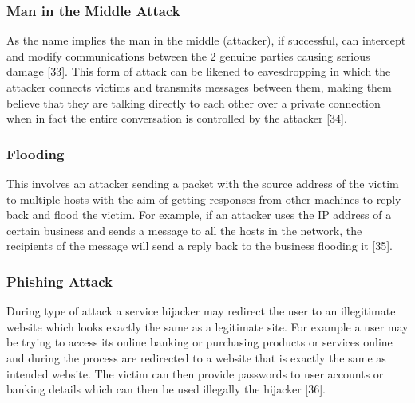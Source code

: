 \documentclass[10pt,journal,compsoc]{IEEEtran}
\begin{document}
\vspace{2mm}
\subsubsection{Man in the Middle Attack}
As the name implies the man in the middle (attacker), if successful, can intercept and modify communications between the 2 genuine parties causing serious damage [33]. This form of attack can be likened to eavesdropping in which the attacker connects victims and transmits messages between them, making them believe that they are talking directly to each other over a private connection when in fact the entire conversation is controlled by the attacker [34]. 

\vspace{2mm}
\subsubsection{Flooding}
This involves an attacker sending a packet with the source address of the victim to multiple hosts with the aim of getting responses from other machines to reply back and flood the victim. For example, if an attacker uses the IP address of a certain business and sends a message to all the hosts in the network, the recipients of the message will send a reply back to the business flooding it [35]. 

\vspace{2mm}
\subsubsection{Phishing Attack}
During type of attack a service hijacker may redirect the user to an illegitimate website which looks exactly the same as a legitimate site. For example a user may be trying to access its online banking or purchasing products or services online and during the process are redirected to a website that is exactly the same as intended website. The victim can then provide passwords to user accounts or banking details which can then be used illegally the hijacker [36].  

\vspace{2mm}
\end{document}
